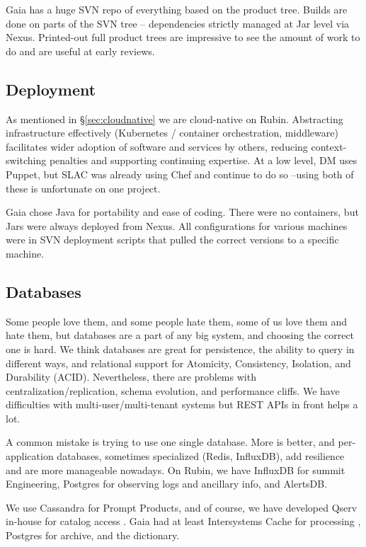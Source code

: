 \documentclass[11pt,twoside]{article}
\begin{document}
Gaia has a huge SVN repo of everything based on the product tree. Builds are done on parts of the SVN tree -- dependencies strictly managed at Jar level via Nexus.
Printed-out full product trees are impressive to see the amount of work to do and are useful at early reviews.

\subsection{Deployment}
As mentioned in \S\ref{sec:cloudnative} we are cloud-native on Rubin.
Abstracting infrastructure effectively (Kubernetes / container orchestration, middleware) facilitates wider adoption of software and services by others, reducing context-switching penalties and supporting continuing expertise.
At a low level, DM uses Puppet, but SLAC was already using Chef and continue to do so --using both of these is unfortunate on one project.

Gaia chose Java for portability and ease of coding.
There were no containers, but Jars were always deployed from Nexus.
All configurations for various machines were in SVN deployment scripts that pulled the correct versions to a specific machine.

\subsection{Databases}
Some people love them, and some people hate them, some of us love them and hate them, but databases are a part of any big system, and choosing the correct one is hard.
We think databases are great for persistence, the ability to query in different ways, and relational support for Atomicity, Consistency, Isolation, and Durability (ACID).
Nevertheless, there are problems with centralization/replication, schema evolution, and performance cliffs.
We have difficulties with multi-user/multi-tenant systems but
REST APIs in front helps a lot.

A common mistake is trying to use one single database.
More is better, and per-application databases, sometimes specialized (Redis, InfluxDB), add resilience and are more manageable nowadays.
On Rubin, we have InfluxDB for summit Engineering, Postgres for observing logs and ancillary info, and AlertsDB.

We use Cassandra for Prompt Products, and of course, we have developed Qserv in-house for catalog access \citep{C15_adassxxxii}.
Gaia had at least Intersystems Cache for processing \citep{2011ExA....31..215O}, Postgres for archive, and the dictionary.
\end{document}
